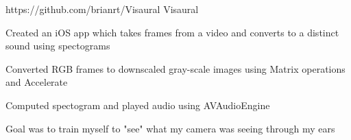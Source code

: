 \begin{cventries}
  \cventry
    {https://github.com/brianrt/Visaural} %
    {Visaural} %
    {} %
    {} %
    {
      \begin{cvitems} %
        \item {Created an iOS app which takes frames from a video and converts to a distinct sound using spectograms}
        \item {Converted RGB frames to downscaled gray-scale images using Matrix operations and Accelerate}
        \item {Computed spectogram and played audio using AVAudioEngine}
        \item {Goal was to train myself to "see" what my camera was seeing through my ears}
      \end{cvitems}
    }

\end{cventries}
